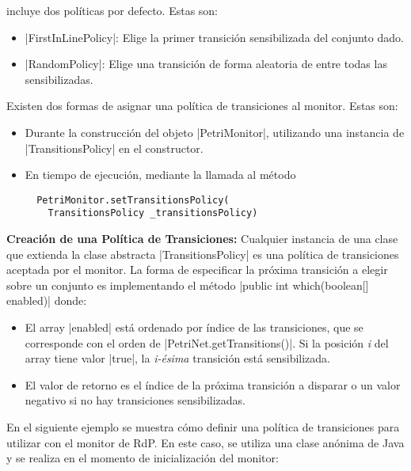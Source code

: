 \javapetriconcurrencymonitor incluye dos políticas por defecto. Estas son:
\begin{itemize}
    \item {}|FirstInLinePolicy|: Elige la primer transición
    sensibilizada del conjunto dado.
    \item {}|RandomPolicy|: Elige una transición de forma aleatoria de
    entre todas las sensibilizadas.
\end{itemize}

Existen dos formas de asignar una política de transiciones al monitor. Estas
son:

\begin{itemize}
    \item Durante la construcción del objeto |PetriMonitor|,
    utilizando una instancia de |TransitionsPolicy| en el
    constructor.
    \item En tiempo de ejecución, mediante la llamada al método\\ {
    \begin{verbatim}
  PetriMonitor.setTransitionsPolicy(
    TransitionsPolicy _transitionsPolicy)
    \end{verbatim}
    }
\end{itemize}

\textbf{Creación de una Política de Transiciones:}
Cualquier instancia de una clase que extienda la clase abstracta
|TransitionsPolicy| es una política de transiciones aceptada por el
monitor. La forma de especificar la próxima transición a elegir sobre un
conjunto es implementando el método |public int which(boolean[]
enabled)| donde:
\begin{itemize}
    \item El array |enabled| está ordenado por índice de las
    transiciones, que se corresponde con el orden de
    |PetriNet.getTransitions()|. Si la posición \textit{i} del array
    tiene valor |true|, la \textit{i-ésima} transición está
    sensibilizada.
    \item El valor de retorno es el índice de la próxima transición a disparar
    o un valor negativo si no hay transiciones sensibilizadas.
\end{itemize}

En el siguiente ejemplo se muestra cómo definir una política de transiciones
para utilizar con el monitor de RdP. En este caso, se utiliza una clase anónima
de Java y se realiza en el momento de inicialización del monitor:

